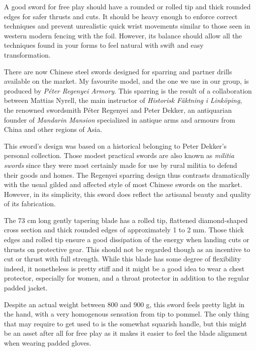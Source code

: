 A good sword for free play should have a rounded or rolled tip and thick rounded edges for safer thrusts and cuts. It should be heavy enough to enforce correct techniques and prevent unrealistic quick wrist movements similar to those seen in western modern fencing with the foil. However, its balance should allow all the techniques found in your \Taijijian{} forms to feel natural with swift and easy transformation.

There are now Chinese steel swords designed for sparring and partner drills available on the market. My favourite model, and the one we use in our group, is produced by \textit{Péter Regenyei Armory}. This sparring \Jian{} is the result of a collaboration between Mattias Nyrell, the main \Jianfa{} instructor of \textit{Historisk Fäktning i Linköping}, the renowned swordsmith Péter Regenyei and Peter Dekker, an antiquarian founder of \textit{Mandarin Mansion} specialized in antique arms and armours from China and other regions of Asia.

This sword's design was based on a historical \Tuanlianjian{} belonging to Peter Dekker's personal collection. Those modest practical swords are also known as \textit{militia swords} since they were most certainly made for use by rural militia to defend their goods and homes. The Regenyei sparring \Jian{} design thus contrasts dramatically with the usual gilded and affected style of most Chinese swords on the market. However, in its simplicity, this sword does reflect the artisanal beauty and quality of its fabrication. 

The 73 cm long gently tapering blade has a rolled tip, flattened diamond-shaped cross section and thick rounded edges of approximately 1 to 2 mm. Those thick edges and rolled tip ensure a good dissipation of the energy when landing cuts or thrusts on protective gear. This should not be regarded though as an incentive to cut or thrust with full strength. While this blade has some degree of flexibility indeed, it nonetheless is pretty stiff and it might be a good idea to wear a chest protector, especially for women, and a throat protector in addition to the regular padded jacket. 

Despite an actual weight between 800 and 900 g, this sword feels pretty light in the hand, with a very homogenous sensation from tip to pommel. The only thing that may require to get used to is the somewhat squarish handle, but this might be an asset after all for free play as it makes it easier to feel the blade alignment when wearing padded gloves.

